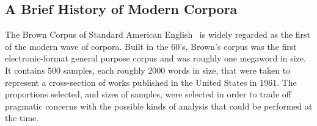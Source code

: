 % 
% 
% 
% 
% 
% 
% 
% 
% 


\subsection{A Brief History of Modern Corpora}
The Brown Corpus of Standard American English~\cite{francis1961brown}
is widely regarded as the first of the modern wave of corpora.  Built in the 60's, Brown's corpus was the first electronic-format general purpose corpus and was roughly one megaword in size.  It contains 500 samples, each roughly 2000 words in size, that were taken to represent a cross-section of works published in the United States in 1961.  The proportions selected, and sizes of samples, were selected in order to trade off pragmatic concerns with the possible kinds of analysis that could be performed at the time.


